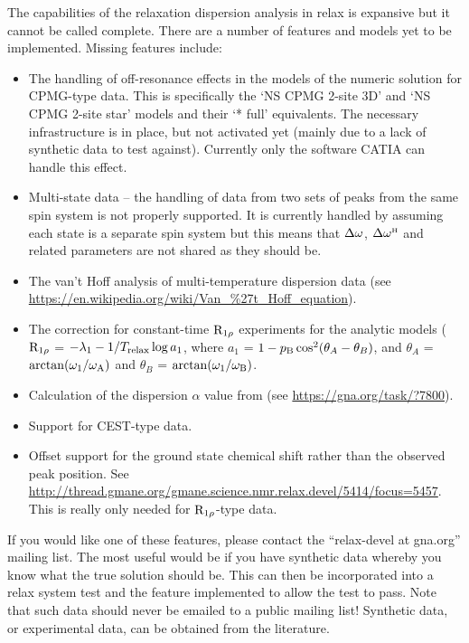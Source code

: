 The capabilities of the relaxation dispersion analysis in relax is expansive but it cannot be called complete.
There are a number of features and models yet to be implemented.
Missing features include:
\begin{itemize}
  \item The handling of off-resonance effects in the models of the numeric solution for CPMG-type data.
    This is specifically the `NS CPMG 2-site 3D' and `NS CPMG 2-site star' models and their `* full' equivalents.
    The necessary infrastructure is in place, but not activated yet (mainly due to a lack of synthetic data to test against).
    Currently only the software CATIA can handle this effect.
  \item Multi-state data -- the handling of data from two sets of peaks from the same spin system is not properly supported.
    It is currently handled by assuming each state is a separate spin system but this means that $\Delta\omega$, $\Delta\omega^{\scriptscriptstyle\mathrm{H}}$ and related parameters are not shared as they should be.
  \item The van't Hoff analysis of multi-temperature dispersion data (see \url{https://en.wikipedia.org/wiki/Van\_\%27t\_Hoff\_equation}).
  \item The \citet{Korzhnev05a} correction for constant-time $\mathrm{R}_{1\rho}$ experiments for the analytic models ($\mathrm{R}_{1\rho}$ = $-\lambda_1 -1/T_{\textrm{relax}}\log{a_1}$, where $a_1$ = $1 - p_{\textrm{B}}\cos^2(\theta_A - \theta_B)$, and $\theta_A$ = $\arctan(\omega_1/\omega_{\textrm{A}})$ and $\theta_B$ = $\arctan(\omega_1/\omega_{\textrm{B}})$.
  \item Calculation of the dispersion $\alpha$ value from \cite{Millet00} (see \url{https://gna.org/task/?7800}).
  \item Support for CEST-type data.
  \item Offset support for the ground state chemical shift rather than the observed peak position.
    See \url{http://thread.gmane.org/gmane.science.nmr.relax.devel/5414/focus=5457}.
    This is really only needed for $\mathrm{R}_{1\rho}$-type data.
\end{itemize}

If you would like one of these features, please contact the ``relax-devel at gna.org'' mailing list.
The most useful would be if you have synthetic data whereby you know what the true solution should be.
This can then be incorporated into a relax system test and the feature implemented to allow the test to pass.
Note that such data should never be emailed to a public mailing list!
Synthetic data, or experimental data, can be obtained from the literature.

